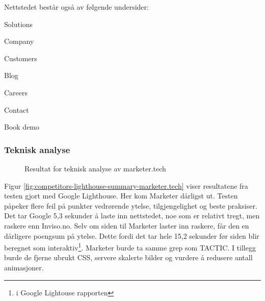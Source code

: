 Nettstedet består også av følgende undersider:
\begin{compactitem}
\item Solutions
\item Company
\item Customers
\item Blog
\item Careers 
\item Contact
\item Book demo
\end{compactitem}

\subsubsection{Teknisk analyse}
\begin{figure}[H]
    \begin{center}
        
        \label{fig:competitors-tech_analysis-marketer.tech}
        \caption{Resultat for teknisk analyse av marketer.tech}
    \end{center}
\end{figure}

Figur \ref{fig:competitors-lighthouse-summary-marketer.tech} viser resultatene fra testen gjort med Google Lighthouse. Her kom Marketer dårligst ut. Testen påpeker flere feil på punkter vedrørende ytelse, tilgjengelighet og beste praksiser. Det tar Google 5,3 sekunder å laste inn nettstedet, noe som er relativt tregt, men raskere enn Inviso.no. Selv om siden til Marketer laster inn raskere, får den en dårligere poengsum på ytelse. Dette fordi det tar hele 15,2 sekunder før siden blir beregnet som interaktiv\footnote{ i Google Lightouse rapporten}. Marketer burde ta samme grep som TACTIC. I tillegg burde de fjerne ubrukt CSS, servere skalerte bilder og vurdere å redusere antall animasjoner.

